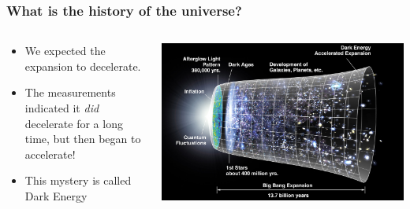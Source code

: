 \documentclass{beamer}
\begin{document}
\frame
{

    \frametitle{What is the history of the universe?}


    \begin{columns}
        \begin{column}{0.5\textwidth}
            \begin{itemize}


                \item We expected the expansion to decelerate. 

                \item The measurements indicated it {\em did} decelerate for a
                    long time, but then began to accelerate!
                    
                \item This mystery is called Dark Energy 
                    

            \end{itemize}
        \end{column}
        \begin{column}{0.5\textwidth}
            \begin{center}
                \includegraphics[width=\textwidth]{CMB_Timeline300_no_WMAP.jpg}
            \end{center}
            
        \end{column}
    \end{columns}


}
\end{document}
